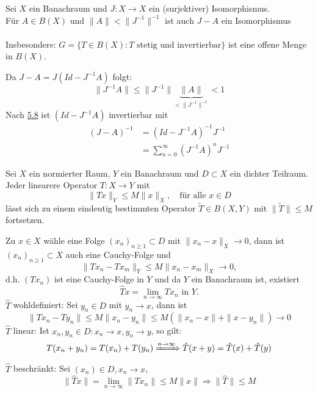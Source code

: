 \begin{kor} \label{kor:5.9}
	Sei $X$ ein Banachraum und $J: X \rightarrow X$ ein (surjektiver) Isomorphismus. \\
	Für $A \in B(X)$ und $\| A \| < \| J^{-1} \|^{-1}$ ist auch $J - A$ ein Isomorphismus \\ \\
	Insbesondere: $G = \{ T \in B(X): T \text{ stetig und invertierbar} \}$ ist eine offene Menge in $B(X)$.
	\begin{beweis}
		Da $J - A = J (Id - J^{-1}A) $ folgt:
		\[ \| J^{-1} A \| \leq \| J^{-1} \| \underbrace{\| A \|}_{< \| J^{-1} \|^{-1}} < 1 \]
		Nach \hyperref[prop:5.8-NeumannscheReihe]{5.8} ist $(Id - J^{-1} A)$ invertierbar mit
			\begin{align*}
				(J - A)^{-1} & = (Id - J^{-1} A)^{-1} J^{-1} \\
					& = \sum_{n = 0}^{\infty} (J^{-1} A)^{n} J^{-1}
			\end{align*}
	\end{beweis}
\end{kor}


\begin{prop} \label{prop:5.10}
	Sei $X$ ein normierter Raum, $Y$ ein Banachraum und $D \subset X$ ein dichter Teilraum. \\
	Jeder linearere Operator $T: X \rightarrow Y$ mit
		\[ \| T x \|_{Y} \leq M \| x \|_{X}, \quad \text{für alle } x \in D \]
	lässt sich zu einem eindeutig bestimmten Operator $ \tilde T \in B(X, Y)$ mit $\| \tilde T \| \leq M	$ fortsetzen.	
\end{prop} 

\begin{beweis}
	Zu $x \in X$ wähle eine Folge $(x_{n})_{n \geq 1} \subset D$ mit $\| x_{n} - x \|_{X} \rightarrow 0$, dann ist $(x_{n})_{n \geq 1} \subset X$ auch eine Cauchy-Folge und
	\[ \| Tx_{n} - Tx_{m} \|_{Y} \leq M \|x_{n} - x_{m} \|_{X} \rightarrow 0,  \]
	d.h. $(Tx_{n})$ ist eine Cauchy-Folge in $Y$ und da $Y$ ein Banachraum ist, existiert 
		\[ \hat T x = \lim_{n \rightarrow \infty} T x_{n} \text{ in } Y. \]
	$\hat T$ wohldefiniert: Sei $y_{n} \in D$ mit $y_{n} \rightarrow x$, dann ist 
		\[ \| T x_{n} - T y_{n} \| \leq M \| x_{n} - y_{n} \| \leq M \left( \| x_{n} - x \| + \| x - y_{n} \| \right) \rightarrow 0 \]
	$\hat T$ linear: Ist $x_{n}, y_{n} \in D : x_{n} \rightarrow x, y_{n} \rightarrow y$, so gilt:
		\[ T(x_{n} + y_{n}) = T(x_{n}) + T(y_{n}) \xRightarrow[]{n \rightarrow \infty} \hat T(x + y) = \hat T(x) + \hat T(y) \]
	$\hat T$ beschränkt: Sei $(x_{n}) \in D, x_{n} \rightarrow x$,
	\[ \| \hat T x \| = \lim_{n \rightarrow \infty} \| T x_{n} \| \leq M \| x \| \Rightarrow \| \hat T \| \leq M \]
\end{beweis}



